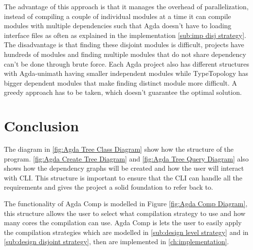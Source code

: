 The advantage of this approach is that it manages the overhead of
parallelization, instead of compiling a couple of individual modules at a time
it can compile modules with multiple dependencies such that Agda doesn't have
to loading interface files as often as explained in the implementation
\cref{sub:imp disj strategy}. The disadvantage is that finding these disjoint
modules is difficult, projects  have hundreds of modules and finding multiple
modules that do not share dependency can't be done through brute force. Each
Agda project also has different structures with Agda-unimath
\cite{agda-unimath} having smaller independent modules while TypeTopology
\cite{type-topology} has bigger dependent modules that make finding distinct
module more difficult. A greedy approach has to be taken, which doesn't
guarantee the optimal solution.



\pagebreak

\section{Conclusion}

The diagram in \cref{fig:Agda Tree Class Diagram} show how the structure of the
program. \cref{fig:Agda Create Tree Diagram} and \cref{fig:Agda Tree Query Diagram} also shows how the dependency graphs will be created and how the user
will interact with CLI. This structure is important to ensure that the
CLI can handle all the requirements and gives the project a solid foundation to
refer back to. 

The functionality of Agda Comp is modelled in Figure \cref{fig:Agda Comp Diagram}, this structure allows the user to select what compilation strategy to
use and how many cores the compilation can use. Agda Comp is lets the user to
easily apply the compilation strategies which are modelled in \cref{sub:design level strategy} and in \cref{sub:design disjoint strategy}, then are
implemented in \cref{ch:implementation}.

